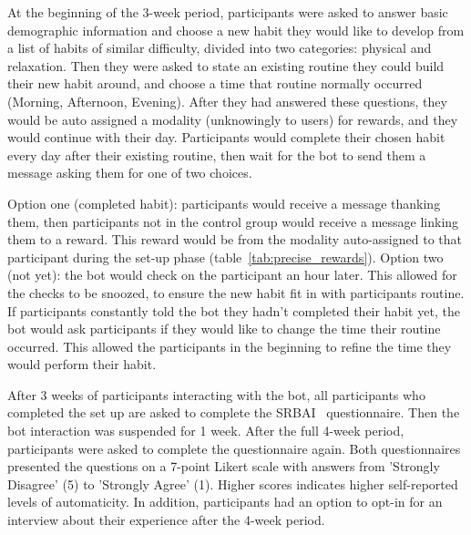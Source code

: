\documentclass{scaffold/sigchi}
\begin{document}
At the beginning of the 3-week period, participants were asked to answer basic demographic information and choose a new habit they would like to develop from a list of habits of similar difficulty, divided into two categories: physical and relaxation. Then they were asked to state an existing routine they could build their new habit around, and choose a time that routine normally occurred (Morning, Afternoon, Evening). After they had answered these questions, they would be auto assigned a modality (unknowingly to users) for rewards, and they would continue with their day. Participants would complete their chosen habit every day after their existing routine, then wait for the bot to send them a message asking them for one of two choices.

Option one (completed habit): participants would receive a message thanking them, then participants not in the control group would receive a message linking them to a reward. This reward would be from the modality auto-assigned to that participant during the set-up phase (table~\ref{tab:precise_rewards}). Option two (not yet): the bot would check on the participant an hour later. This allowed for the checks to be snoozed, to ensure the new habit fit in with participants routine. If participants constantly told the bot they hadn't completed their habit yet, the bot would ask participants if they would like to change the time their routine occurred. This allowed the participants in the beginning to refine the time they would perform their habit.

After 3 weeks of participants interacting with the bot, all participants who completed the set up are asked to complete the SRBAI~\cite{article_4q_SRBAI} questionnaire. Then the bot interaction was suspended for 1 week. After the full 4-week period, participants were asked to complete the questionnaire again. Both questionnaires presented the questions on a 7-point Likert scale with answers from 'Strongly Disagree' (5) to 'Strongly Agree' (1). Higher scores indicates higher self-reported levels of automaticity. In addition, participants had an option to opt-in for an interview about their experience after the 4-week period.
\end{document}
